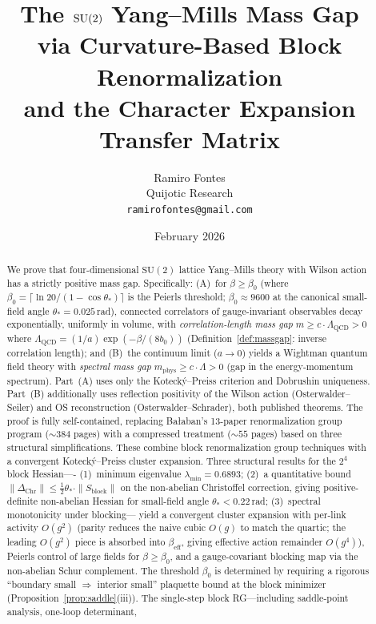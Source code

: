 \documentclass[11pt]{article}
\title{The $\SU(2)$ Yang--Mills Mass Gap\\
via Curvature-Based Block Renormalization\\
and the Character Expansion Transfer Matrix}
\author{Ramiro Fontes\\Quijotic Research\\\texttt{ramirofontes@gmail.com}}
\date{February 2026}
\theoremstyle{definition}
\newcommand{\SU}{\mathrm{SU}}
\newcommand{\Lam}{\Lambda_{\mathrm{QCD}}}
\begin{document}
\maketitle

\begin{abstract}
We prove that four-dimensional $\SU(2)$ lattice Yang--Mills theory
with Wilson action has a
strictly positive mass gap.  Specifically:
(A)~for $\beta\ge\beta_0$ (where
$\beta_0=\lceil\ln 20/(1-\cos\theta_*)\rceil$ is the Peierls
threshold; $\beta_0\approx 9600$ at the canonical small-field
angle $\theta_*=0.025$\,rad), connected correlators of gauge-invariant
observables decay exponentially, uniformly in volume, with
\emph{correlation-length mass gap}
$m\ge c\cdot\Lam>0$ where $\Lam=(1/a)\exp(-\beta/(8b_0))$
(Definition~\ref{def:massgap}: inverse correlation length); and
(B)~the continuum limit ($a\to 0$) yields a Wightman quantum field
theory with \emph{spectral mass gap} $m_{\mathrm{phys}}\ge c\cdot\Lambda>0$
(gap in the energy-momentum spectrum).
Part~(A) uses only the Koteck\'y--Preiss criterion and Dobrushin
uniqueness.  Part~(B) additionally uses reflection positivity
of the Wilson action (Osterwalder--Seiler) and OS reconstruction
(Osterwalder--Schrader), both published theorems.
The proof is fully
self-contained, replacing Ba\l aban's 13-paper renormalization group
program (${\sim}384$ pages) with a compressed treatment
(${\sim}55$ pages) based on three structural simplifications.
These combine block
renormalization group techniques with a convergent Koteck\'y--Preiss
cluster expansion.  Three structural results for the
$2^4$ block Hessian----%
(1)~minimum eigenvalue $\lambda_{\min}=0.6893$;
(2)~a quantitative bound $\|\Delta_{\mathrm{Chr}}\|\le\tfrac{1}{2}\theta_*\cdot
\|S_{\mathrm{block}}\|$ on the non-abelian Christoffel correction, giving
positive-definite non-abelian Hessian for small-field angle $\theta_*<0.22$\,rad;
(3)~spectral monotonicity under blocking---%
yield a convergent cluster expansion with per-link activity $O(g^2)$
(parity reduces the naive cubic $O(g)$ to match the quartic; the
leading $O(g^2)$ piece is absorbed into $\beta_{\mathrm{eff}}$,
giving effective action remainder $O(g^4)$), Peierls
control of large fields for $\beta\ge\beta_0$, and a gauge-covariant
blocking map via the non-abelian Schur complement.  The threshold
$\beta_0$ is determined by requiring a rigorous ``boundary
small $\Rightarrow$ interior small'' plaquette bound at the block
minimizer (Proposition~\ref{prop:saddle}(iii)).  The single-step
block RG---including saddle-point analysis, one-loop determinant,

\end{abstract}
\end{document}
